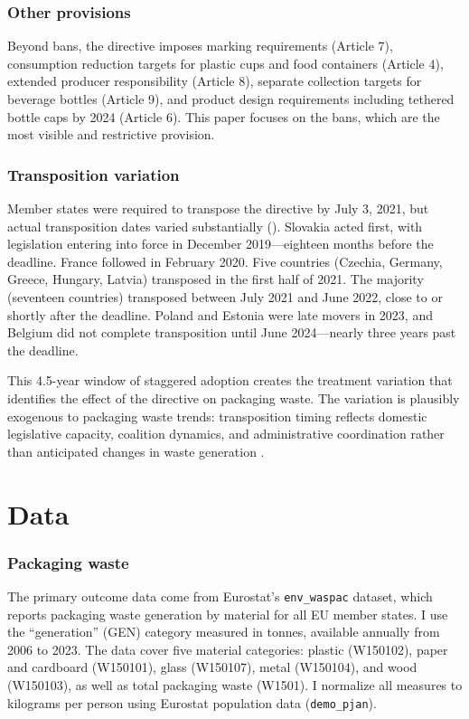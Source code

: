\documentclass[12pt]{article}
\begin{document}
\subsubsection*{Other provisions} Beyond bans, the directive imposes marking requirements (Article 7), consumption reduction targets for plastic cups and food containers (Article 4), extended producer responsibility (Article 8), separate collection targets for beverage bottles (Article 9), and product design requirements including tethered bottle caps by 2024 (Article 6). This paper focuses on the bans, which are the most visible and restrictive provision.

\subsubsection*{Transposition variation} Member states were required to transpose the directive by July 3, 2021, but actual transposition dates varied substantially (). Slovakia acted first, with legislation entering into force in December 2019---eighteen months before the deadline. France followed in February 2020. Five countries (Czechia, Germany, Greece, Hungary, Latvia) transposed in the first half of 2021. The majority (seventeen countries) transposed between July 2021 and June 2022, close to or shortly after the deadline. Poland and Estonia were late movers in 2023, and Belgium did not complete transposition until June 2024---nearly three years past the deadline.

This 4.5-year window of staggered adoption creates the treatment variation that identifies the effect of the directive on packaging waste. The variation is plausibly exogenous to packaging waste trends: transposition timing reflects domestic legislative capacity, coalition dynamics, and administrative coordination rather than anticipated changes in waste generation \citep{thomson2007time, kaeding2006determinants}.


\section{Data}
\label{sec:data}

\subsubsection*{Packaging waste} The primary outcome data come from Eurostat's \texttt{env\_waspac} dataset, which reports packaging waste generation by material for all EU member states. I use the ``generation'' (GEN) category measured in tonnes, available annually from 2006 to 2023. The data cover five material categories: plastic (W150102), paper and cardboard (W150101), glass (W150107), metal (W150104), and wood (W150103), as well as total packaging waste (W1501). I normalize all measures to kilograms per person using Eurostat population data (\texttt{demo\_pjan}).
\end{document}
